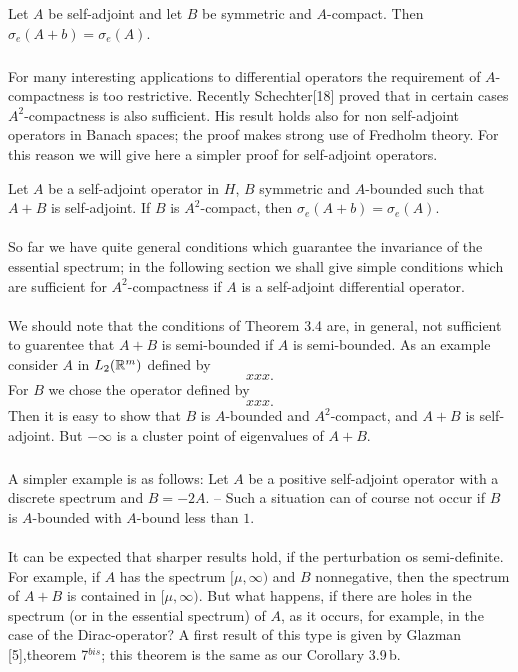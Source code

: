 \documentclass[11pt,twoside]{article}
\begin{document}
\begin{theorem} %
Let $A$ be self-adjoint and let $B$ be symmetric and $A$-compact.
Then $\sigma_e(A+b) = \sigma_e(A)$.
\end{theorem}

\subparagraph*{}
For many interesting applications to differential operators the
requirement of $A$-compactness is too restrictive.
Recently Schechter[18] proved that in certain cases $A^2$-compactness is
also sufficient.
His result holds also for non self-adjoint operators in Banach spaces;
the proof makes strong use of Fredholm theory.
For this reason we will give here a simpler proof for self-adjoint operators.

\begin{theorem} %
Let $A$ be a self-adjoint operator in $H$, $B$ symmetric and $A$-bounded
such that $A+B$ is self-adjoint.
If $B$ is $A^2$-compact,
then $\sigma_e(A+b) = \sigma_e(A)$.
\end{theorem}


\paragraph*{}
So far we have quite general conditions which guarantee the invariance
of the essential spectrum;
in the following section we shall give simple conditions which are sufficient
for $A^2$-compactness if $A$ is a self-adjoint differential operator.

\paragraph*{}
We should note that the conditions of Theorem 3.4 are, in general,
not sufficient to guarentee that $A+B$ is semi-bounded if $A$ is semi-bounded.
As an example consider $A$ in $L_2({\mathbb{R}}^m)$ defined by
\[
xxx.
\]
For $B$ we chose the operator defined by
\[
xxx.
\]
Then it is easy to show that $B$ is $A$-bounded and $A^2$-compact,
and $A+B$ is self-adjoint.
But $-\infty$ is a cluster point of eigenvalues of $A+B$.

\subparagraph*{}
A simpler example is as follows:
Let $A$ be a positive self-adjoint operator with a discrete spectrum
and $B = -2A$. -- Such a situation can of course not occur
if $B$ is $A$-bounded with $A$-bound less than $1$.

\paragraph*{}
It can be expected that sharper results hold, if the perturbation os semi-definite.
For example, if $A$ has the spectrum $[\mu,\infty)$ and $B$ nonnegative,
then the spectrum of $A+B$ is contained in $[\mu,\infty)$.
But what happens, if there are holes in the spectrum (or in the essential spectrum)
of $A$, as it occurs, for example, in the case of the Dirac-operator?
A first result of this type is given by Glazman [5],theorem 7$^{bis}$;
this theorem is the same as our Corollary 3.9\,b.
\end{document}
